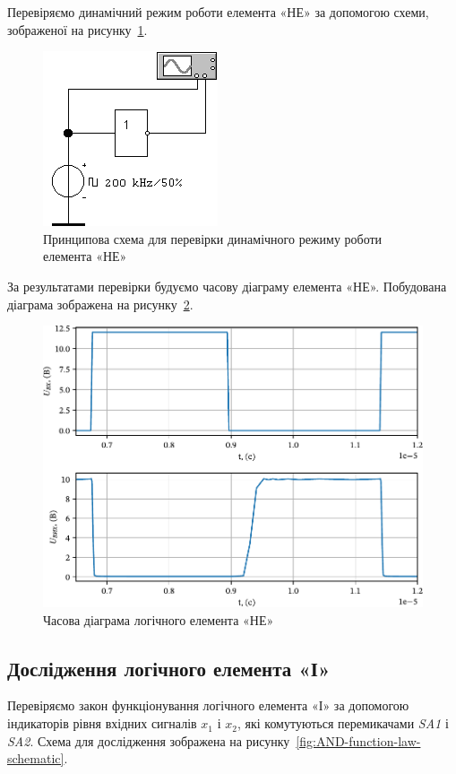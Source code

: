 \documentclass[a4paper,oneside,DIV=10,12pt]{scrartcl}
\newcommand\schel[1]{\textit{#1}}
\begin{document}
			Перевіряємо динамічний режим роботи елемента «НЕ» за допомогою схеми, зображеної на рисунку~\ref{fig:schematic-not-dynamic-mode}.
			
			\begin{figure}[!htbp]
			\centering
				\includegraphics[]{schematics/01-04-not.png}
			\caption{Принципова схема для перевірки динамічного режиму роботи елемента «НЕ»}
			\label{fig:schematic-not-dynamic-mode}
			\end{figure}
			
			За результатами перевірки будуємо часову діаграму елемента «НЕ». Побудована діаграма зображена на рисунку~\ref{fig:not-time-diagram}.
			
			\begin{figure}[!htbp]
			\centering
				\includegraphics[width=\textwidth]{plots/03-pdf/01-NOT-time-diagram-edited.pdf}
			\caption{Часова діаграма логічного елемента «НЕ»}
			\label{fig:not-time-diagram}
			\end{figure}
			
		\subsection{Дослідження логічного елемента «І»}
			Перевіряємо закон функціонування логічного елемента «І» за допомогою індикаторів рівня вхідних сигналів $x_1$ і $x_2$, які комутуються перемикачами \schel{SA1} і \schel{SA2}. Схема для дослідження зображена на рисунку~\ref{fig:AND-function-law-schematic}.
		
\end{document}
